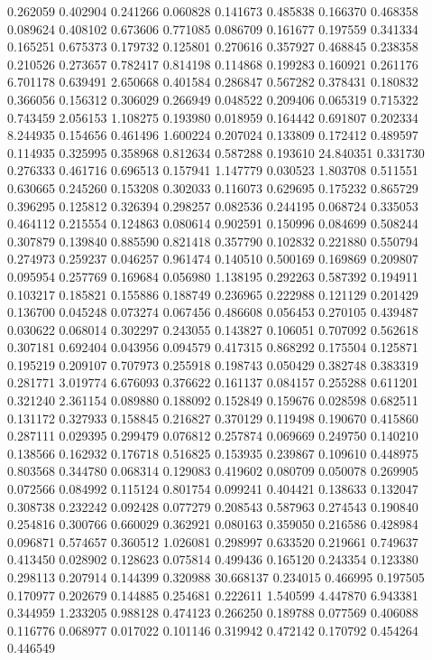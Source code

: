 0.262059
0.402904
0.241266
0.060828
0.141673
0.485838
0.166370
0.468358
0.089624
0.408102
0.673606
0.771085
0.086709
0.161677
0.197559
0.341334
0.165251
0.675373
0.179732
0.125801
0.270616
0.357927
0.468845
0.238358
0.210526
0.273657
0.782417
0.814198
0.114868
0.199283
0.160921
0.261176
6.701178
0.639491
2.650668
0.401584
0.286847
0.567282
0.378431
0.180832
0.366056
0.156312
0.306029
0.266949
0.048522
0.209406
0.065319
0.715322
0.743459
2.056153
1.108275
0.193980
0.018959
0.164442
0.691807
0.202334
8.244935
0.154656
0.461496
1.600224
0.207024
0.133809
0.172412
0.489597
0.114935
0.325995
0.358968
0.812634
0.587288
0.193610
24.840351
0.331730
0.276333
0.461716
0.696513
0.157941
1.147779
0.030523
1.803708
0.511551
0.630665
0.245260
0.153208
0.302033
0.116073
0.629695
0.175232
0.865729
0.396295
0.125812
0.326394
0.298257
0.082536
0.244195
0.068724
0.335053
0.464112
0.215554
0.124863
0.080614
0.902591
0.150996
0.084699
0.508244
0.307879
0.139840
0.885590
0.821418
0.357790
0.102832
0.221880
0.550794
0.274973
0.259237
0.046257
0.961474
0.140510
0.500169
0.169869
0.209807
0.095954
0.257769
0.169684
0.056980
1.138195
0.292263
0.587392
0.194911
0.103217
0.185821
0.155886
0.188749
0.236965
0.222988
0.121129
0.201429
0.136700
0.045248
0.073274
0.067456
0.486608
0.056453
0.270105
0.439487
0.030622
0.068014
0.302297
0.243055
0.143827
0.106051
0.707092
0.562618
0.307181
0.692404
0.043956
0.094579
0.417315
0.868292
0.175504
0.125871
0.195219
0.209107
0.707973
0.255918
0.198743
0.050429
0.382748
0.383319
0.281771
3.019774
6.676093
0.376622
0.161137
0.084157
0.255288
0.611201
0.321240
2.361154
0.089880
0.188092
0.152849
0.159676
0.028598
0.682511
0.131172
0.327933
0.158845
0.216827
0.370129
0.119498
0.190670
0.415860
0.287111
0.029395
0.299479
0.076812
0.257874
0.069669
0.249750
0.140210
0.138566
0.162932
0.176718
0.516825
0.153935
0.239867
0.109610
0.448975
0.803568
0.344780
0.068314
0.129083
0.419602
0.080709
0.050078
0.269905
0.072566
0.084992
0.115124
0.801754
0.099241
0.404421
0.138633
0.132047
0.308738
0.232242
0.092428
0.077279
0.208543
0.587963
0.274543
0.190840
0.254816
0.300766
0.660029
0.362921
0.080163
0.359050
0.216586
0.428984
0.096871
0.574657
0.360512
1.026081
0.298997
0.633520
0.219661
0.749637
0.413450
0.028902
0.128623
0.075814
0.499436
0.165120
0.243354
0.123380
0.298113
0.207914
0.144399
0.320988
30.668137
0.234015
0.466995
0.197505
0.170977
0.202679
0.144885
0.254681
0.222611
1.540599
4.447870
6.943381
0.344959
1.233205
0.988128
0.474123
0.266250
0.189788
0.077569
0.406088
0.116776
0.068977
0.017022
0.101146
0.319942
0.472142
0.170792
0.454264
0.446549

